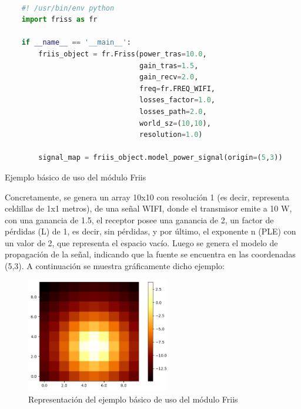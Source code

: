 \begin{code}[H]
    \begin{lstlisting}[language=Python]

    #! /usr/bin/env python
    import friss as fr

    if __name__ == '__main__':
        friis_object = fr.Friss(power_tras=10.0,
                                gain_tras=1.5,
                                gain_recv=2.0,
                                freq=fr.FREQ_WIFI,
                                losses_factor=1.0,
                                losses_path=2.0,
                                world_sz=(10,10),
                                resolution=1.0)

        signal_map = friis_object.model_power_signal(origin=(5,3))

\end{lstlisting}
\caption[Ejemplo básico de uso del módulo Friis]{Ejemplo básico de uso del módulo Friis}
\label{cod:friis_basics}
\end{code}

Concretamente, se genera un array 10x10 con resolución 1 (es decir, representa celdillas de 1x1 metros), de una señal WIFI, donde el transmisor emite a 10 W, con una ganancia de 1.5, el receptor posee una ganancia de 2, un factor de pérdidas (L) de 1, es decir, sin pérdidas, y por último, el exponente n (\ac{PLE}) con un valor de 2, que representa el espacio vacío. Luego se genera el modelo de propagación de la señal, indicando que la fuente se encuentra en las coordenadas (5,3). A continuación se muestra gráficamente dicho ejemplo:\\

\begin{figure} [H]
	\begin{center}
	\includegraphics[height=5cm]{imagenes/cap4/4_heatmap_example.png}
	\end{center}
	\caption[Representación del ejemplo básico de uso del módulo Friis]{Representación del ejemplo básico de uso del módulo Friis}
	\label{fig:heat_ex}
\end{figure}

